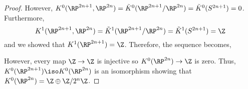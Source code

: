 \documentclass[12pt]{extarticle}
\begin{document}
\begin{proof}
However, $K^0(\RP^{2n + 1}, \RP^{2n}) = \tilde{K}^0(\RP^{2n + 1} / \RP^{2n}) = \tilde{K}^0(S^{2n + 1}) = 0$. Furthermore,
\[ K^1(\RP^{2n + 1}, \RP^{2n}) = \tilde{K}^1(\RP^{2n + 1} / \RP^{2n}) = \tilde{K}^1(S^{2n + 1}) = \Z \]
and we showed that $K^1(\RP^{2n + 1}) = \Z$. Therefore, the sequence becomes,
\begin{center}
\end{center}
However, every map $\Z \to \Z$ is injective so $K^0(\RP^{2n}) \to \Z$ is zero. Thus, $K^0(\RP^{2n + 1}) \iso K^0(\RP^{2n})$ is an isomorphism showing that $K^0(\RP^{2n}) = \Z \oplus \Z / 2^n \Z$.

\end{proof}
\end{document}
